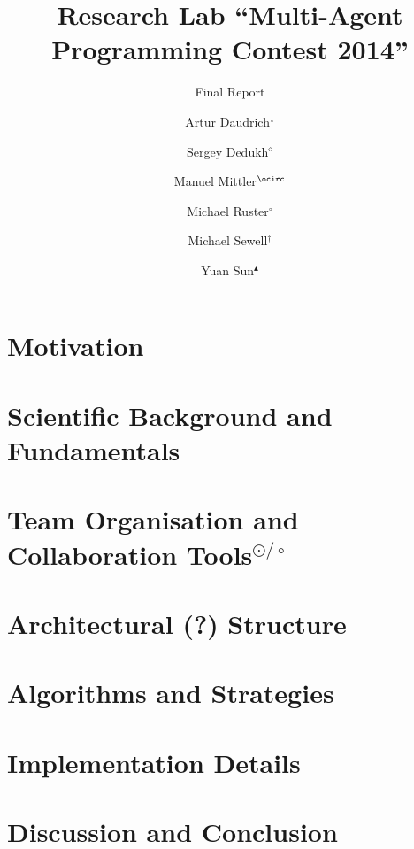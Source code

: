 \documentclass{../tech_reports/template/llncs}
\title{Research Lab \enquote{Multi-Agent Programming Contest 2014}}
\subtitle{Final Report}
\author{Artur Daudrich$^{\star}$ \and Sergey Dedukh$^{\diamond}$ \and Manuel Mittler$^{\ocirc}$ \and Michael Ruster$^{\circ}$ \and Michael Sewell$^{\dagger}$ \and Yuan Sun$^{\blacktriangle}$}
\institute{University of Koblenz-Landau, Koblenz Campus}
\begin{document}
\maketitle

\tableofcontents
\clearpage
{}

\section{Motivation}


\section{Scientific Background and Fundamentals}


\section[Team Organisation and Collaboration Tools]{Team Organisation and Collaboration Tools$^{\odot/\circ}$} %


\section{Architectural (?) Structure}


\section{Algorithms and Strategies}


\section{Implementation Details}


\section{Discussion and Conclusion}


%
%
\printbibliography
\end{document}
